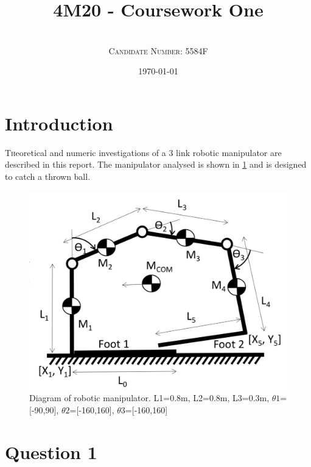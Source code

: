 \documentclass[twoside,twocolumn]{article}
\title{4M20 - Coursework One} %
\author{%
\\
\textsc{Candidate Number: 5584F}%
}
\date{\today} %
\begin{document}
\onecolumn

\twocolumn
\maketitle


\section{Introduction}

\lettrine[nindent=0em,lines=3]{T}heoretical and numeric investigations of a 3 link robotic manipulator are described in this report. The manipulator analysed is shown in \ref{fig:diagram} and is designed to catch a thrown ball. 

\begin{figure}[h]
  \centering
    \includegraphics[width=\linewidth]{diagram}
  \caption{Diagram of robotic manipulator. L1=0.8m, L2=0.8m, L3=0.3m, $\theta1$=[-90,90], $\theta2$=[-160,160], $\theta3$=[-160,160]}
  \label{fig:diagram}
\end{figure}

\section{Question 1}
\end{document}
